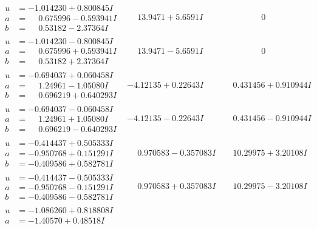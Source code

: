 \documentclass[1p]{elsarticle_modified}
\theoremstyle{definition}
\begin{document}
$$\begin{array}{c|c|c}
 \hline 
\begin{aligned}
u &= -1.014230 + 0.800845 I \\
a &= \phantom{-}0.675996 - 0.593941 I \\
b &= \phantom{-}0.53182 - 2.37364 I\end{aligned}
 & \phantom{-}13.9471 + 5.6591 I & \phantom{-0.000000 } 0 \\ \hline\begin{aligned}
u &= -1.014230 - 0.800845 I \\
a &= \phantom{-}0.675996 + 0.593941 I \\
b &= \phantom{-}0.53182 + 2.37364 I\end{aligned}
 & \phantom{-}13.9471 - 5.6591 I & \phantom{-0.000000 } 0 \\ \hline\begin{aligned}
u &= -0.694037 + 0.060458 I \\
a &= \phantom{-}1.24961 - 1.05080 I \\
b &= \phantom{-}0.696219 + 0.640293 I\end{aligned}
 & -4.12135 + 0.22643 I & \phantom{-}0.431456 + 0.910944 I \\ \hline\begin{aligned}
u &= -0.694037 - 0.060458 I \\
a &= \phantom{-}1.24961 + 1.05080 I \\
b &= \phantom{-}0.696219 - 0.640293 I\end{aligned}
 & -4.12135 - 0.22643 I & \phantom{-}0.431456 - 0.910944 I \\ \hline\begin{aligned}
u &= -0.414437 + 0.505333 I \\
a &= -0.950768 + 0.151291 I \\
b &= -0.409586 + 0.582781 I\end{aligned}
 & \phantom{-}0.970583 - 0.357083 I & \phantom{-}10.29975 + 3.20108 I \\ \hline\begin{aligned}
u &= -0.414437 - 0.505333 I \\
a &= -0.950768 - 0.151291 I \\
b &= -0.409586 - 0.582781 I\end{aligned}
 & \phantom{-}0.970583 + 0.357083 I & \phantom{-}10.29975 - 3.20108 I \\ \hline\begin{aligned}
u &= -1.086260 + 0.818808 I \\
a &= -1.40570 + 0.48518 I \\

\end{aligned}
\end{array}$$
\end{document}
